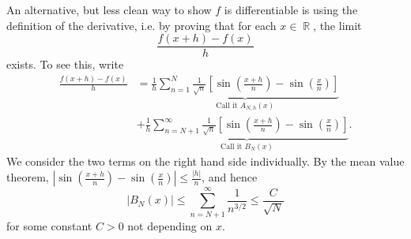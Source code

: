 \documentclass[answers]{exam}
\DeclareMathOperator{\RR}{\mathbb{R}}
\theoremstyle{problemstyle}
\newcommand{\1}[1]{\textbf{1}_{\left[#1\right]}} %
\begin{document}
\begin{questions}
\begin{parts}
\begin{solution}
		An alternative, but less clean way to show $f$ is differentiable is using the definition of the derivative, i.e. by proving that for each $x \in \RR$, the limit
		\[ \frac{f(x+h)-f(x)}{h} \]
		exists. To see this, write
    \begin{align}
          \label{eq:fall2015-0}
          \frac{f(x+h)-f(x)}{h} 
          &= \underbrace{\frac{1}{h} \sum_{n=1}^{N}
            \frac{1}{\sqrt{n}}\left[ \sin \left( \frac{x+h}{n} \right)
            - \sin \left( \frac{x}{n} \right)   \right]}_{\text{Call it }A_{N,h}(x)} \nonumber\\
            \quad&+ \underbrace{\frac{1}{h} \sum_{n=N+1}^{\infty}
            \frac{1}{\sqrt{n}}\left[ \sin \left( \frac{x+h}{n} \right)
            - \sin \left( \frac{x}{n} \right)   \right]}_{\text{Call it }B_{N}(x)}.
        \end{align}
        We consider the two terms on the right hand side individually. By the mean value theorem, $ \left|\sin \left( \frac{x+h}{n} \right)
        - \sin \left( \frac{x}{n} \right)\right|\leq \frac{|h|}{n}$, and hence
        \begin{equation}\label{eq:fall2015-1}
          |B_{N}(x)| \leq \sum_{n=N+1}^{\infty}\frac{1}{n^{3/2}} \leq \frac{C}{\sqrt{N}}
        \end{equation}
        for some constant $C>0$ not depending on $x$.
        

\end{solution}
\end{parts}
\end{questions}
\end{document}
